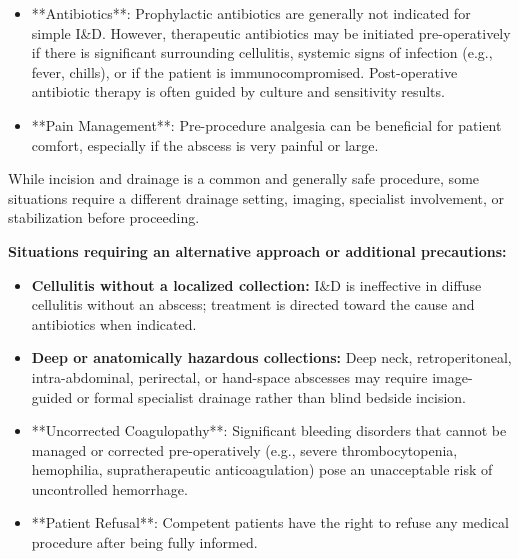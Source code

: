 \begin{itemize}
  \item **Antibiotics**: Prophylactic antibiotics are generally not indicated for simple I\&D. However, therapeutic antibiotics may be initiated pre-operatively if there is significant surrounding cellulitis, systemic signs of infection (e.g., fever, chills), or if the patient is immunocompromised. Post-operative antibiotic therapy is often guided by culture and sensitivity results.

  \item **Pain Management**: Pre-procedure analgesia can be beneficial for patient comfort, especially if the abscess is very painful or large.
\end{itemize}

While incision and drainage is a common and generally safe procedure, some situations require a different drainage setting, imaging, specialist involvement, or stabilization before proceeding.

\textbf{Situations requiring an alternative approach or additional precautions:}
\begin{itemize}
  \item \textbf{Cellulitis without a localized collection:} I\&D is ineffective in diffuse cellulitis without an abscess; treatment is directed toward the cause and antibiotics when indicated.

  \item \textbf{Deep or anatomically hazardous collections:} Deep neck, retroperitoneal, intra-abdominal, perirectal, or hand-space abscesses may require image-guided or formal specialist drainage rather than blind bedside incision.

  \item **Uncorrected Coagulopathy**: Significant bleeding disorders that cannot be managed or corrected pre-operatively (e.g., severe thrombocytopenia, hemophilia, supratherapeutic anticoagulation) pose an unacceptable risk of uncontrolled hemorrhage.

  \item **Patient Refusal**: Competent patients have the right to refuse any medical procedure after being fully informed.
\end{itemize}

